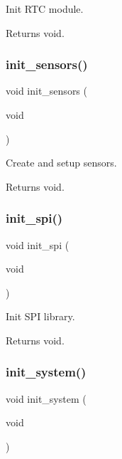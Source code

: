 Init R\+TC module. 

\begin{DoxyReturn}{Returns}
void. 
\end{DoxyReturn}
\mbox{\label{i2c-th_8ino_ac74850003fab6eb3269bfe043d0f939c}} 
\subsubsection{\texorpdfstring{init\+\_\+sensors()}{init\_sensors()}}
{\footnotesize\ttfamily void init\+\_\+sensors (\begin{DoxyParamCaption}\item[{void}]{ }\end{DoxyParamCaption})}



Create and setup sensors. 

\begin{DoxyReturn}{Returns}
void. 
\end{DoxyReturn}
\mbox{\label{i2c-th_8ino_a8eb9780a3438ec02c70314744f91f3c7}} 
\subsubsection{\texorpdfstring{init\+\_\+spi()}{init\_spi()}}
{\footnotesize\ttfamily void init\+\_\+spi (\begin{DoxyParamCaption}\item[{void}]{ }\end{DoxyParamCaption})}



Init S\+PI library. 

\begin{DoxyReturn}{Returns}
void. 
\end{DoxyReturn}
\mbox{\label{i2c-th_8ino_afceb890a6ab9be73cc5481369538c705}} 
\subsubsection{\texorpdfstring{init\+\_\+system()}{init\_system()}}
{\footnotesize\ttfamily void init\+\_\+system (\begin{DoxyParamCaption}\item[{void}]{ }\end{DoxyParamCaption})}



